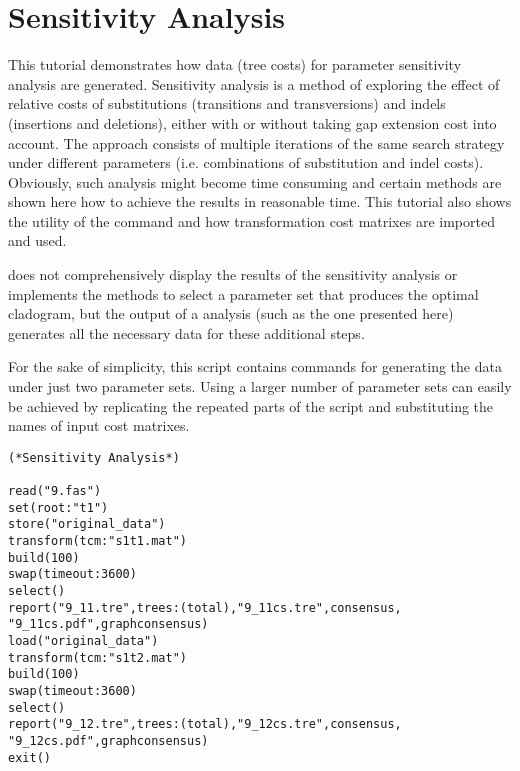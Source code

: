 
\section{Sensitivity Analysis}{\label{tutorial7}}

This tutorial demonstrates how data (tree costs) for parameter
sensitivity analysis are generated. Sensitivity analysis \cite{wheeler1995}
is a method of exploring the effect of relative costs of substitutions
(transitions and transversions) and indels (insertions and deletions),
either with or without taking gap extension cost into account. The
approach consists of multiple iterations of the same search strategy
under different parameters (i.e. combinations of substitution and
indel costs).  Obviously, such analysis might become time consuming
and certain methods are shown here how to achieve the results in
reasonable time. This tutorial also shows the utility of the command 
 and how transformation cost matrixes are 
imported and used.

\poy does not comprehensively display the results of the sensitivity
analysis or implements the methods to select a parameter set that
produces the optimal cladogram, but the output of a \poy analysis
(such as the one presented here) generates all the necessary data
for these additional steps.

For the sake of simplicity, this script contains commands for
generating the data under just two parameter  sets.  Using a larger
number of parameter sets can easily be achieved by replicating the
repeated parts of the script and substituting the names of input
cost matrixes.

\begin{verbatim}
(*Sensitivity Analysis*)

read("9.fas")
set(root:"t1")
store("original_data")
transform(tcm:"s1t1.mat")
build(100)
swap(timeout:3600)
select()
report("9_11.tre",trees:(total),"9_11cs.tre",consensus,
"9_11cs.pdf",graphconsensus)
load("original_data")
transform(tcm:"s1t2.mat")
build(100)
swap(timeout:3600)
select()
report("9_12.tre",trees:(total),"9_12cs.tre",consensus,
"9_12cs.pdf",graphconsensus)
exit()
\end{verbatim}

